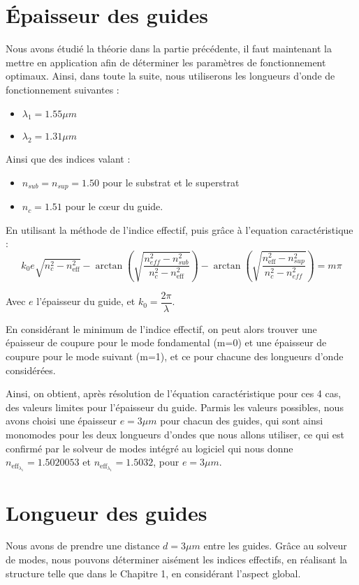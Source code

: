 \documentclass[a4paper,11pt]{report}
\begin{document}
\section{Épaisseur des guides}
Nous avons étudié la théorie dans la partie précédente, il faut maintenant la mettre en application afin de déterminer les paramètres de fonctionnement optimaux. Ainsi, dans toute la suite, nous utiliserons les longueurs d'onde de fonctionnement suivantes :
\begin{itemize}
    \item $\lambda_1=1.55\mu m$
    \item $\lambda_2=1.31\mu m$
\end{itemize}
Ainsi que des indices valant :
\begin{itemize}
    \item  $n_{sub}=n_{sup}=1.50$ pour le substrat et le superstrat
    \item  $n_{c}=1.51$ pour le cœur du guide.
    \newline
\end{itemize}

En utilisant la méthode de l'indice effectif, puis grâce à l'equation caractéristique :
\begin{equation}
    k_0e\sqrt{n_c^2-n_{\text{eff}}^2}-\arctan\left(\sqrt{\dfrac{n_{eff}^2-n_{sub}^2}{n_{c}^2-n_{\text{eff}}^2}}\right)-\arctan\left(\sqrt{\dfrac{n_{\text{eff}}^2-n_{sup}^2}{n_{c}^2-n_{eff}^2}}\right)=m\pi
\end{equation}

Avec $e$ l'épaisseur du guide, et $k_0=\dfrac{2\pi}{\lambda}$.

En considérant le minimum de l'indice effectif, on peut alors trouver une épaisseur de coupure pour le mode fondamental (m=0) et une épaisseur de coupure pour le mode suivant (m=1), et ce pour chacune des longueurs d'onde considérées.

Ainsi, on obtient, après résolution de l'équation caractéristique pour ces 4 cas, des valeurs limites pour l'épaisseur du guide. Parmis les valeurs possibles, nous avons choisi une épaisseur $e=3\mu m$ pour chacun des guides, qui sont ainsi monomodes pour les deux longueurs d'ondes que nous allons utiliser, ce qui est confirmé par le solveur de modes intégré au logiciel qui nous donne $n_{\text{eff}_{\lambda_1}}=1.5020053$ et $n_{\text{eff}_{\lambda_1}}=1.5032$, pour $e=3\mu m$.

\section{Longueur des guides}
Nous avons de prendre une distance $d=3\mu m$ entre les guides. Grâce au solveur de modes, nous pouvons déterminer aisément les indices effectifs, en réalisant la structure telle que dans le Chapitre 1, en considérant l'aspect global.
\end{document}
